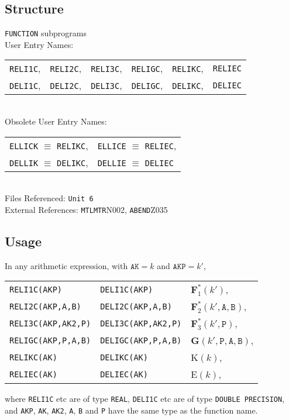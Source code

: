\documentclass[]{article}
\begin{document}
\subsection{Structure}
\texttt{FUNCTION} subprograms \\
User Entry Names:
\begin{tabular}[t]{l*{5}{@{\hspace{4pt}}l}}
\texttt{RELI1C}, & \texttt{RELI2C}, & \texttt{RELI3C}, & \texttt{RELIGC}, &
\texttt{RELIKC}, & \texttt{RELIEC} \\
\texttt{DELI1C}, & \texttt{DELI2C}, & \texttt{DELI3C}, & \texttt{DELIGC}, &
\texttt{DELIKC}, & \texttt{DELIEC}
\end{tabular} \\
Obsolete User Entry Names:
\begin{tabular}[t]{l@{\hspace{4pt}}l}
\texttt{ELLICK} $\equiv$ \texttt{RELIKC}, &
\texttt{ELLICE} $\equiv$ \texttt{RELIEC}, \\
\texttt{DELLIK} $\equiv$ \texttt{DELIKC}, &
\texttt{DELLIE} $\equiv$ \texttt{DELIEC}
\end{tabular} \\
Files Referenced: \texttt{Unit 6} \\
External References: \texttt{MTLMTR}{N002}, \texttt{ABEND}{Z035}
\subsection{Usage}
In any arithmetic expression, with $\mathtt{AK}=k$ and $\mathtt{AKP}=k'$,
\begin{center}
\begin{tabular}{l@{\quad or \quad}l@{\quad has the value \quad}l}
\texttt{RELI1C(AKP)} & \texttt{DELI1C(AKP)} & $\mathbf{F}_1^*(k')$,\\
\texttt{RELI2C(AKP,A,B)} & \texttt{DELI2C(AKP,A,B)} &
$\mathbf{F}_2^*(k',\mathtt{A,B})$,\\
\texttt{RELI3C(AKP,AK2,P)} & \texttt{DELI3C(AKP,AK2,P)} &
$\mathbf{F}_3^*(k',\mathtt{P})$, \\
\texttt{RELIGC(AKP,P,A,B)} & \texttt{DELIGC(AKP,P,A,B)} &
$\mathbf{G}(k',\mathtt{P,A,B})$, \\
\texttt{RELIKC(AK)} & \texttt{DELIKC(AK)} & K$(k)$, \\
\texttt{RELIEC(AK)} & \texttt{DELIEC(AK)} & E$(k)$,
\end{tabular}
\end{center}
where \texttt{RELI1C} etc are of type \texttt{REAL}, \texttt{DELI1C} etc are of
type \texttt{DOUBLE PRECISION}, and \texttt{AKP}, \texttt{AK}, \texttt{AK2}, \texttt{A},
\texttt{B} and \texttt{P} have the same type as the function name.
\end{document}
